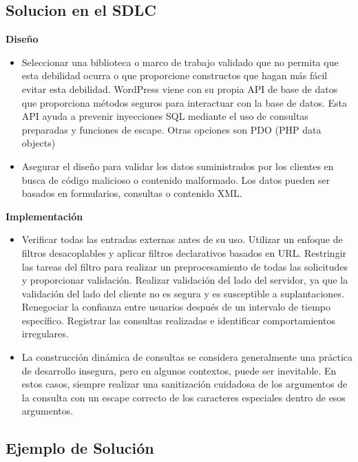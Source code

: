 \subsection{Solucion en el SDLC}

\textbf{Diseño}

\begin{itemize}
    \item Seleccionar una biblioteca o marco de trabajo validado que no permita que esta debilidad ocurra o que proporcione constructos que hagan más fácil evitar esta debilidad. WordPress viene con su propia API de base de datos que proporciona métodos seguros para interactuar con la base de datos. Esta API ayuda a prevenir inyecciones SQL mediante el uso de consultas preparadas y funciones de escape. Otras opciones son PDO (PHP data objects) 
    \item Asegurar el diseño para validar los datos suministrados por los clientes en busca de código malicioso o contenido malformado. Los datos pueden ser basados en formularios, consultas o contenido XML.


\end{itemize}

\textbf{Implementación}

\begin{itemize}
    \item Verificar todas las entradas externas antes de su uso. Utilizar un enfoque de filtros desacoplables y aplicar filtros declarativos basados en URL. Restringir las tareas del filtro para realizar un preprocesamiento de todas las solicitudes y proporcionar validación. Realizar validación del lado del servidor, ya que la validación del lado del cliente no es segura y es susceptible a suplantaciones. Renegociar la confianza entre usuarios después de un intervalo de tiempo específico. Registrar las consultas realizadas e identificar comportamientos irregulares.
    \item La construcción dinámica de consultas se considera generalmente una práctica de desarrollo insegura, pero en algunos contextos, puede ser inevitable. En estos casos, siempre realizar una sanitización cuidadosa de los argumentos de la consulta con un escape correcto de los caracteres especiales dentro de esos argumentos.
\end{itemize}


\subsection{Ejemplo de Solución}

